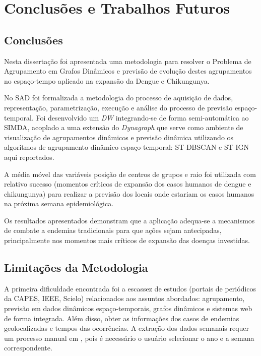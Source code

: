 \chapter{Conclusões e Trabalhos Futuros}
\label{chap:conclusoes-e-trabalhos-futuros}

\section{Conclusões}
\label{sec:conclusoes}

Nesta dissertação foi apresentada uma metodologia para resolver o Problema de Agrupamento em Grafos Dinâmicos e previsão de evolução destes agrupamentos no espaço-tempo aplicado na expansão da Dengue e Chikungunya.

No \acrfull{SAD} foi formalizada a metodologia do processo de aquisição de dados, representação, parametrização, execução e análise do processo de previsão espaço-temporal. Foi desenvolvido um \textit{\acrfull{DW}} integrando-se de forma semi-automática ao \acrshort{SIMDA}, acoplado a uma extensão do \emph{Dynagraph} que serve como ambiente de visualização de agrupamentos dinâmicos e previsão dinâmica utilizando os algoritmos de agrupamento dinâmico espaço-temporal: \acrshort{ST-DBSCAN} e \acrshort{ST-IGN} aqui reportados. 

A média móvel das variáveis posição de centros de grupos e raio foi utilizada com relativo sucesso (momentos críticos de expansão dos casos humanos de dengue e chikungunya) para realizar a previsão dos locais onde estariam os casos humanos na próxima semana epidemiológica.   

Os resultados apresentados demonstram que a aplicação adequa-se a mecanismos de combate a endemias tradicionais para que ações sejam antecipadas, principalmente nos momentos mais críticos de expansão das doenças investidas. 

\section{Limitações da Metodologia}
\label{sec:limitacoes}

A primeira dificuldade encontrada foi a escassez de estudos (portais de periódicos da \acrshort{CAPES}, \acrshort{IEEE}, Scielo) relacionados aos assuntos abordados: agrupamento, previsão em dados dinâmicos espaço-temporais, grafos dinâmicos e sistemas web de forma integrada. Além disso, obter as informações dos casos de endemias geolocalizadas e tempos das ocorrências. A extração dos dados semanais requer um processo manual em \cite{simda},
pois é necessário o usuário selecionar o ano e a semana correspondente.

